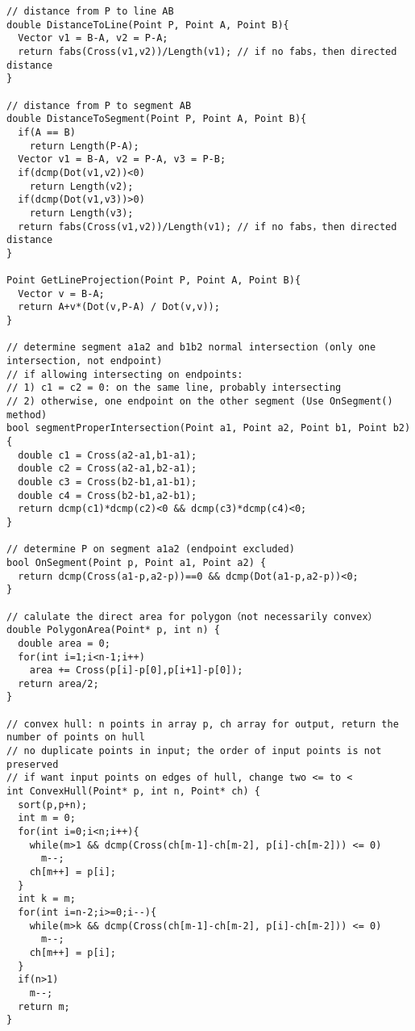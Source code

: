 \documentclass[letterpaper]{article}
\begin{document}
\begin{lstlisting}
// distance from P to line AB
double DistanceToLine(Point P, Point A, Point B){
  Vector v1 = B-A, v2 = P-A;
  return fabs(Cross(v1,v2))/Length(v1); // if no fabs，then directed distance
}

// distance from P to segment AB
double DistanceToSegment(Point P, Point A, Point B){
  if(A == B)
    return Length(P-A);
  Vector v1 = B-A, v2 = P-A, v3 = P-B;
  if(dcmp(Dot(v1,v2))<0)
    return Length(v2);
  if(dcmp(Dot(v1,v3))>0)
    return Length(v3);
  return fabs(Cross(v1,v2))/Length(v1); // if no fabs，then directed distance
}

Point GetLineProjection(Point P, Point A, Point B){
  Vector v = B-A;
  return A+v*(Dot(v,P-A) / Dot(v,v));
}

// determine segment a1a2 and b1b2 normal intersection (only one intersection, not endpoint)
// if allowing intersecting on endpoints: 
// 1) c1 = c2 = 0: on the same line, probably intersecting
// 2) otherwise, one endpoint on the other segment (Use OnSegment() method)
bool segmentProperIntersection(Point a1, Point a2, Point b1, Point b2){
  double c1 = Cross(a2-a1,b1-a1);
  double c2 = Cross(a2-a1,b2-a1);
  double c3 = Cross(b2-b1,a1-b1);
  double c4 = Cross(b2-b1,a2-b1);
  return dcmp(c1)*dcmp(c2)<0 && dcmp(c3)*dcmp(c4)<0;
}

// determine P on segment a1a2 (endpoint excluded)
bool OnSegment(Point p, Point a1, Point a2) {
  return dcmp(Cross(a1-p,a2-p))==0 && dcmp(Dot(a1-p,a2-p))<0;
}

// calulate the direct area for polygon（not necessarily convex）
double PolygonArea(Point* p, int n) {
  double area = 0;
  for(int i=1;i<n-1;i++)
    area += Cross(p[i]-p[0],p[i+1]-p[0]);
  return area/2;
}

// convex hull: n points in array p, ch array for output, return the number of points on hull
// no duplicate points in input; the order of input points is not preserved
// if want input points on edges of hull, change two <= to <
int ConvexHull(Point* p, int n, Point* ch) {
  sort(p,p+n);
  int m = 0;
  for(int i=0;i<n;i++){
    while(m>1 && dcmp(Cross(ch[m-1]-ch[m-2], p[i]-ch[m-2])) <= 0)
      m--;
    ch[m++] = p[i];
  }
  int k = m;
  for(int i=n-2;i>=0;i--){
    while(m>k && dcmp(Cross(ch[m-1]-ch[m-2], p[i]-ch[m-2])) <= 0)
      m--;
    ch[m++] = p[i];
  }
  if(n>1)
    m--;
  return m;
}


\end{lstlisting}
\end{document}
